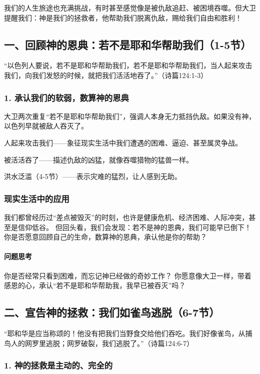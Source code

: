 \documentclass[a4paper, 12pt]{article}
\begin{document}
我们的人生旅途也充满挑战，有时甚至感觉像是被仇敌追赶、被困境吞噬。但大卫提醒我们：神是我们的拯救者，他帮助我们脱离仇敌，赐给我们自由和胜利！

\subsection*{一、回顾神的恩典：若不是耶和华帮助我们（1-5节）}
“以色列人要说，若不是耶和华帮助我们，若不是耶和华帮助我们，当人起来攻击我们，向我们发怒的时候，就把我们活活地吞了。”（诗篇124:1-3）

\subsubsection*{1. 承认我们的软弱，数算神的恩典}
大卫两次重复“若不是耶和华帮助我们”，强调人本身无力抵挡仇敌。如果没有神，以色列早就被敌人吞灭了。

人起来攻击我们——象征现实生活中我们遭遇的困难、逼迫、甚至属灵争战。

被活活吞了——描述仇敌的凶猛，就像吞噬猎物的猛兽一样。

洪水泛滥（4-5节）——表示灾难的猛烈，让人感到无助。

\subsubsection*{现实生活中的应用}

我们都曾经历过“差点被毁灭”的时刻，也许是健康危机、经济困难、人际冲突，甚至是信仰低谷。
但回头看，我们会发现：若不是神的恩典，我们可能早已倒下！
你是否愿意回顾自己的生命，数算神的恩典，承认他是你的帮助？
\paragraph*{问题思考}

你是否经常只看到困难，而忘记神已经做的奇妙工作？
你愿意像大卫一样，带着感恩的心，承认“若不是耶和华帮助我，我早已被吞灭”吗？
\subsection*{二、宣告神的拯救：我们如雀鸟逃脱（6-7节）}
“耶和华是应当称颂的！他没有把我们当野食交给他们吞吃。我们好像雀鸟，从捕鸟人的网罗里逃脱；网罗破裂，我们逃脱了。”（诗篇124:6-7）

\subsubsection*{1. 神的拯救是主动的、完全的}
\end{document}
